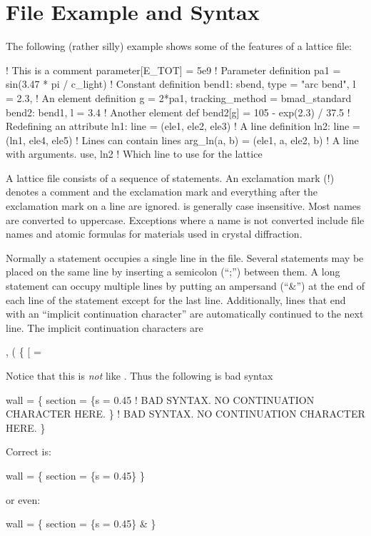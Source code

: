 \section{File Example and Syntax}

The following (rather silly) example shows some of the features of a
\bmad lattice file:
\begin{example}
  ! This is a comment
  parameter[E_TOT] = 5e9                   ! Parameter definition
  pa1 = sin(3.47 * pi / c_light)                 ! Constant definition
  bend1: sbend, type = "arc bend", l = 2.3,      ! An element definition
      g = 2*pa1, tracking_method = bmad_standard
  bend2: bend1, l = 3.4                          ! Another element def
  bend2[g] = 105 - exp(2.3) / 37.5               ! Redefining an attribute
  ln1: line = (ele1, ele2, ele3)                 ! A line definition
  ln2: line = (ln1, ele4, ele5)                  ! Lines can contain lines
  arg_ln(a, b) = (ele1, a, ele2, b)              ! A line with arguments.
  use, ln2                                       ! Which line to use for the lattice
\end{example}

A \bmad lattice file consists of a sequence of statements. An
exclamation mark (!) denotes a comment and the exclamation mark and
everything after the exclamation mark on a line are ignored.  \bmad is
generally case insensitive. Most names are converted to
uppercase. Exceptions where a name is not converted include file names
and atomic formulas for materials used in crystal diffraction.

Normally a statement occupies a single line in the file. Several
statements may be placed on the same line by inserting a semicolon
(``;'') between them. A long statement can occupy multiple lines by
putting an ampersand (``\&'') at the end of each line of the statement
except for the last line. Additionally, lines that end with an
``implicit continuation character''
are automatically continued to the next line. The implicit continuation 
characters are
\begin{example}
  ,   (   \{   [   =
\end{example}
Notice
that this is {\em not} like . Thus the following is bad syntax
\begin{example}
  wall = \{
    section = \{s = 0.45     ! BAD SYNTAX. NO CONTINUATION CHARACTER HERE.
    \}                       ! BAD SYNTAX. NO CONTINUATION CHARACTER HERE.
  \}
\end{example}
Correct is:
\begin{example}
  wall = \{
    section = \{s = 0.45\} \}
\end{example}
or even:
\begin{example}
  wall = \{
    section = \{s = 0.45\} \&
  \}
\end{example}

